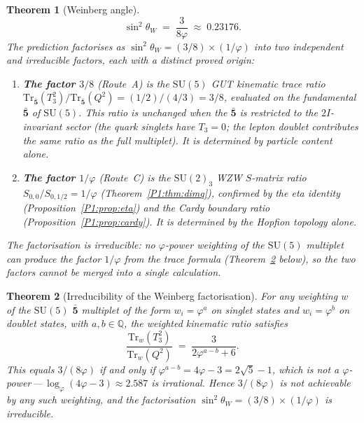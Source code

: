 \documentclass[11pt,a4paper]{article}
\newtheorem{theorem}{Theorem}[section]
\theoremstyle{definition}
\theoremstyle{remark}
\newcommand{\vp}{\varphi}
\newcommand{\sinW}{\sin^{2}\!\theta_{W}}
\begin{document}
\begin{theorem}[Weinberg angle]
\label{P1:thm:weinberg}
\begin{equation}
  \boxed{\sinW \;=\; \frac{3}{8\vp} \;\approx\; 0.23176.}
  \label{P1:eq:weinberg}
\end{equation}
The prediction factorises as $\sinW = (3/8)\times(1/\vp)$ into two
independent and irreducible factors, each with a distinct proved origin:
\begin{enumerate}[noitemsep]
  \item \textbf{The factor $3/8$} (Route~A) is the $\mathrm{SU}(5)$ GUT
    kinematic trace ratio
    $\mathrm{Tr}_{\bar{\mathbf{5}}}(T_3^2)/\mathrm{Tr}_{\bar{\mathbf{5}}}(Q^2)
    = (1/2)/(4/3) = 3/8$,
    evaluated on the fundamental $\bar{\mathbf{5}}$ of $\mathrm{SU}(5)$.
    This ratio is unchanged when the $\bar{\mathbf{5}}$ is restricted to
    the $2I$-invariant sector (the quark singlets have $T_3=0$; the
    lepton doublet contributes the same ratio as the full multiplet).
    It is determined by particle content alone.
  \item \textbf{The factor $1/\vp$} (Route~C) is the $\mathrm{SU}(2)_3$
    WZW $S$-matrix ratio $S_{0,0}/S_{0,1/2}=1/\vp$
    (Theorem~\ref{P1:thm:dimq}), confirmed by the eta identity
    (Proposition~\ref{P1:prop:eta}) and the Cardy boundary ratio
    (Proposition~\ref{P1:prop:cardy}).
    It is determined by the Hopfion topology alone.
\end{enumerate}
The factorisation is \emph{irreducible}: no $\vp$-power weighting of the
$\mathrm{SU}(5)$ multiplet can produce the factor $1/\vp$ from the trace
formula (Theorem~\ref{P1:thm:irreducible} below), so the two factors cannot
be merged into a single calculation.
\end{theorem}

\begin{theorem}[Irreducibility of the Weinberg factorisation]
\label{P1:thm:irreducible}
For any weighting $w$ of the $\mathrm{SU}(5)$ $\bar{\mathbf{5}}$
multiplet of the form $w_i=\vp^a$ on singlet states and $w_i=\vp^b$
on doublet states, with $a,b\in\mathbb{Q}$, the weighted kinematic ratio
satisfies
\begin{equation}
  \frac{\mathrm{Tr}_w(T_3^2)}{\mathrm{Tr}_w(Q^2)}
  \;=\;
  \frac{3}{2\vp^{a-b}+6}.
  \label{P1:eq:irreducible_formula}
\end{equation}
This equals $3/(8\vp)$ if and only if $\vp^{a-b} = 4\vp-3 = 2\sqrt{5}-1$,
which is not a $\vp$-power\,---\,$\log_\vp(4\vp-3) \approx 2.587$ is
irrational.  Hence $3/(8\vp)$ is not achievable by any such weighting,
and the factorisation $\sinW=(3/8)\times(1/\vp)$ is irreducible.
\end{theorem}
\end{document}
